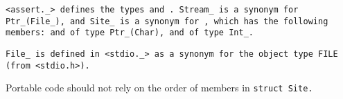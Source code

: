 \tt{<assert._>} defines the types  and .
\tt{Stream_} is a synonym for \tt{Ptr_(File_)}, and \tt{Site_} is
a synonym for , which has the following members:
 and  of type
\tt{Ptr_(Char)}, and  of type \tt{Int_}.

\note \tt{File_} is defined in \tt{<stdio._>} as a synonym
for the object type \tt{FILE} (from \tt{<stdio.h>}).


Portable code should not rely on the order of members in \tt{struct Site}.
